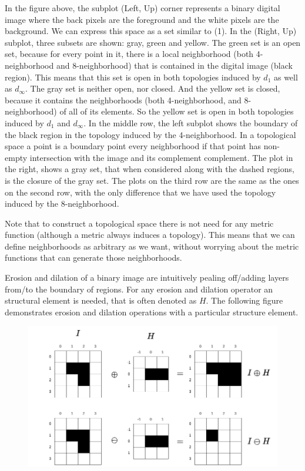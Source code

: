 \documentclass[11pt,a4paper]{article}
\theoremstyle{definition}
\theoremstyle{remark}
\begin{document}
	In the figure above, the subplot (Left, Up) corner represents a binary digital image where the back pixels are the foreground and the white pixels are the background. We can express this space as a set similar to (1). In the (Right, Up) subplot, three subsets are shown: gray, green and yellow. The green set is an open set, because for every point in it, there is a local neighborhood (both 4-neighborhood and 8-neighborhood) that is contained in the digital image (black region). This means that this set is open in both topologies induced by $ d_1 $ as well as $ d_\infty $. The gray set is neither open, nor closed. And the yellow set is closed, because it contains the neighborhoods (both 4-neighborhood, and 8-neighborhood) of all of its elements. So the yellow set is open in both topologies induced by $ d_1 $ and $ d_\infty $. In the middle row, the left subplot shows the boundary of the black region in the topology induced by the 4-neighborhood. In a topological space a point is a boundary point every neighborhood if that point has non-empty intersection with the image and its complement complement. The plot in the right, shows a gray set, that when considered along with the dashed regions, is the closure of the gray set. The plots on the third row are the same as the ones on the second row, with the only difference that we have used the topology induced by the 8-neighborhood.
	
	Note that to construct a topological space there is not need for any metric function (although a metric always induces a topology). This means that we can define neighborhoods as arbitrary as we want, without worrying about the metric functions that can generate those neighborhoods.
	
	Erosion and dilation of a binary image are intuitively pealing off/adding layers from/to the boundary of regions. For any erosion and dilation operator an structural element is needed, that is often denoted as $ H $. The following figure demonstrates erosion and dilation operations with a particular structure element.
	\begin{figure}[h!]
		\centering
		\includegraphics[width=0.7\linewidth]{images/dilationErosion}
		\label{fig:dilationerosion}
	\end{figure}
	\FloatBarrier
	
\end{document}
